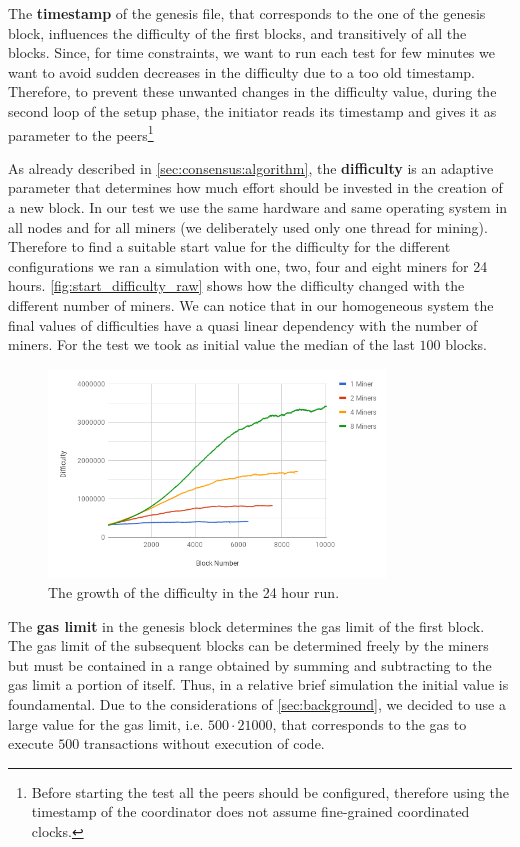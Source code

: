 The \textbf{timestamp} of the genesis file, that corresponds to the one of the
genesis block, influences the difficulty of the first blocks, and transitively
of all the blocks.
Since, for time constraints, we want to run each test for few minutes we want
to avoid sudden decreases in the difficulty due to a too old timestamp.
Therefore, to prevent these unwanted changes in the difficulty value, during the
second loop of the setup phase, the initiator reads its timestamp and gives it
as parameter to the peers\footnote{Before starting the test all the
peers should be configured, therefore using the timestamp of the coordinator
does not assume fine-grained coordinated clocks.}

As already described in \autoref{sec:consensus:algorithm}, the
\textbf{difficulty} is an adaptive parameter  that determines how much effort
should be invested in the creation of a new block. In our test we use the same
hardware and same operating system in all nodes and for all miners (we
deliberately used only one thread for mining). Therefore to find a suitable
start value for the difficulty for the different configurations we ran a
simulation with one, two, four and eight miners for 24 hours.
\autoref{fig:start_difficulty_raw} shows how the difficulty changed with the
different number of miners. We can notice that in our homogeneous system the
final values of difficulties have a quasi linear dependency with the number of
miners. For the test we took as initial value the median of the last $100$
blocks.
\begin{figure}
    \begin{center}
        \includegraphics[width=0.8\textwidth]{./res/img/start_difficulty_all.png}
        \caption{The growth of the difficulty in the 24 hour run.}
        \label{fig:start_difficulty_raw}
    \end{center}
\end{figure}

The \textbf{gas limit} in the genesis block determines the gas limit of the
first block. The gas limit of the subsequent blocks can be determined freely by
the miners but must be contained in a range obtained by summing and subtracting
to the gas limit a portion of itself. Thus, in a relative brief simulation the
initial value is foundamental. Due to the considerations of
\autoref{sec:background}, we decided to use a large value for the gas limit,
i.e. $500 \cdot 21000$, that corresponds to the gas to execute $500$
transactions without execution of code.





